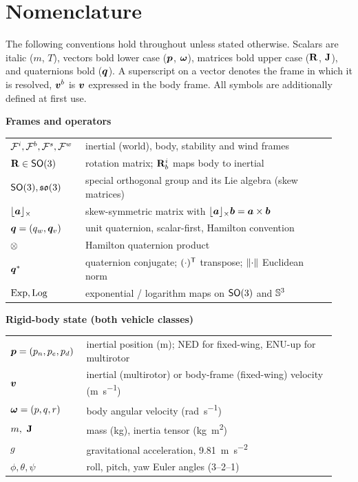 \chapter*{Nomenclature}

The following conventions hold throughout unless stated otherwise. Scalars are
italic ($m$, $T$), vectors bold lower case ($\bm{p}$, $\bm{\omega}$), matrices
bold upper case ($\mathbf{R}$, $\mathbf{J}$), and quaternions bold ($\bm{q}$). A
superscript on a vector denotes the frame in which it is resolved, \eg
$\bm{v}^{b}$ is $\bm{v}$ expressed in the body frame. All symbols are
additionally defined at first use.

\vspace{2mm}
\noindent\textbf{Frames and operators}
{\small
\begin{longtable}{@{}p{0.20\linewidth}p{0.74\linewidth}@{}}
\toprule
$\mathcal{F}^{i},\mathcal{F}^{b},\mathcal{F}^{s},\mathcal{F}^{w}$ & inertial (world), body, stability and wind frames \\
$\mathbf{R}\in\mathsf{SO}(3)$ & rotation matrix; $\mathbf{R}_{b}^{i}$ maps body to inertial \\
$\mathsf{SO}(3),\mathfrak{so}(3)$ & special orthogonal group and its Lie algebra (skew matrices) \\
$\lfloor \bm{a} \rfloor_{\times}$ & skew-symmetric matrix with $\lfloor \bm{a} \rfloor_{\times}\bm{b}=\bm{a}\times\bm{b}$ \\
$\bm{q}=(q_w,\bm{q}_v)$ & unit quaternion, scalar-first, Hamilton convention \\
$\otimes$ & Hamilton quaternion product \\
$\bm{q}^{\ast}$ & quaternion conjugate; $(\cdot)^{\mathsf{T}}$ transpose; $\left\lVert \cdot \right\rVert$ Euclidean norm \\
$\operatorname{Exp},\operatorname{Log}$ & exponential / logarithm maps on $\mathsf{SO}(3)$ and $\mathbb{S}^3$ \\
\bottomrule
\end{longtable}}

\noindent\textbf{Rigid-body state (both vehicle classes)}
{\small
\begin{longtable}{@{}p{0.20\linewidth}p{0.74\linewidth}@{}}
\toprule
$\bm{p}=(p_n,p_e,p_d)$ & inertial position (\si{\meter}); NED for fixed-wing, ENU-up for multirotor \\
$\bm{v}$ & inertial (multirotor) or body-frame (fixed-wing) velocity (\si{\meter\per\second}) \\
$\bm{\omega}=(p,q,r)$ & body angular velocity (\si{\radian\per\second}) \\
$m,\ \mat{J}$ & mass (\si{\kilogram}), inertia tensor (\si{\kilogram\meter\squared}) \\
$g$ & gravitational acceleration, \SI{9.81}{\meter\per\second\squared} \\
$\phi,\theta,\psi$ & roll, pitch, yaw Euler angles (3--2--1) \\
\bottomrule
\end{longtable}}

